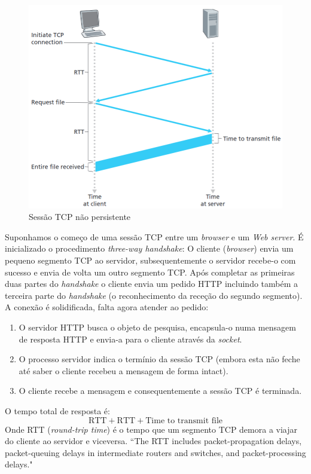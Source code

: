 \begin{figure}[H]
    \centering
    \includegraphics[width = 0.85\linewidth]{img/2/nao-resistente.png}
    \caption{Sessão TCP não persistente}
    \label{fig:nao-persistente}
\end{figure}

\noindent Suponhamos o começo de uma sessão TCP entre um \textit{browser} e um \textit{Web server}. É inicializado o procedimento \textit{three-way handshake}: O cliente (\textit{browser}) envia um pequeno segmento TCP ao servidor, subsequentemente o servidor recebe-o com sucesso e envia de volta um outro segmento TCP. Após completar as primeiras duas partes do \textit{handshake} o cliente envia um pedido HTTP incluindo também a terceira parte do \textit{handshake} (o reconhecimento da receção do segundo segmento). A conexão é solidificada, falta agora atender ao pedido:

\begin{enumerate}
    \item O servidor HTTP busca o objeto de pesquisa, encapsula-o numa mensagem de resposta HTTP e envia-a para o cliente através da \textit{socket}.
    \item O processo servidor indica o termínio da sessão TCP (embora esta não feche até saber o cliente recebeu a mensagem de forma intact).
    \item O cliente recebe a mensagem e consequentemente a sessão TCP é terminada.
\end{enumerate}

\noindent O tempo total de resposta é:
$$
    \boxed{\text{RTT} + \text{RTT} + \text{Time to transmit file}}
$$
\noindent Onde RTT (\textit{round-trip time}) é o tempo que um segmento TCP demora a viajar do cliente ao servidor e viceversa. ``The RTT includes packet-propagation delays, packet-queuing delays in intermediate routers and switches, and packet-processing delays."\cite{Kurose2017}

